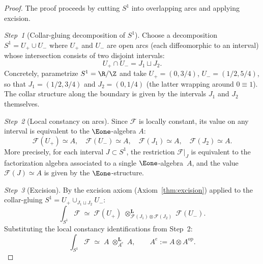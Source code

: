 \begin{proof}
The proof proceeds by cutting $S^1$ into overlapping arcs and
applying excision.

\emph{Step~1} (Collar-gluing decomposition of $S^1$).
Choose a decomposition $S^1 = U_+ \cup U_-$ where $U_+$ and $U_-$
are open arcs (each diffeomorphic to an interval) whose intersection
consists of two disjoint intervals:
\[
U_+ \cap U_- = J_1 \sqcup J_2.
\]
Concretely, parametrize $S^1 = \R / \Z$ and take
$U_+ = (0, 3/4)$, $U_- = (1/2, 5/4)$, so that
$J_1 = (1/2, 3/4)$ and $J_2 = (0, 1/4)$ (the latter wrapping around
$0 \equiv 1$). The collar structure along the boundary is given by
the intervals $J_1$ and $J_2$ themselves.

\emph{Step~2} (Local constancy on arcs).
Since $\mathcal{F}$ is locally constant, its value on any interval is
equivalent to the $\Eone$-algebra $A$:
\[
\mathcal{F}(U_+) \simeq A, \quad
\mathcal{F}(U_-) \simeq A, \quad
\mathcal{F}(J_1) \simeq A, \quad
\mathcal{F}(J_2) \simeq A.
\]
More precisely, for each interval $J \subset S^1$, the restriction
$\mathcal{F}|_J$ is equivalent to the factorization algebra associated
to a single $\Eone$-algebra~$A$, and the value $\mathcal{F}(J) \simeq A$
is given by the $\Eone$-structure.

\emph{Step~3} (Excision).
By the excision axiom (Axiom~\ref{thm:excision}) applied to the
collar-gluing $S^1 = U_+ \cup_{J_1 \sqcup J_2} U_-$:
\begin{equation}\label{eq:excision-circle}
\int_{S^1} \mathcal{F}
\;\simeq\;
\mathcal{F}(U_+)
\;\otimes^{\mathbf{L}}_{\mathcal{F}(J_1) \otimes \mathcal{F}(J_2)}\;
\mathcal{F}(U_-).
\end{equation}
Substituting the local constancy identifications from Step~2:
\begin{equation}\label{eq:excision-substituted}
\int_{S^1} \mathcal{F}
\;\simeq\;
A \;\otimes^{\mathbf{L}}_{A^e}\; A,
\qquad A^e := A \otimes A^{\mathrm{op}}.
\end{equation}


\end{proof}
